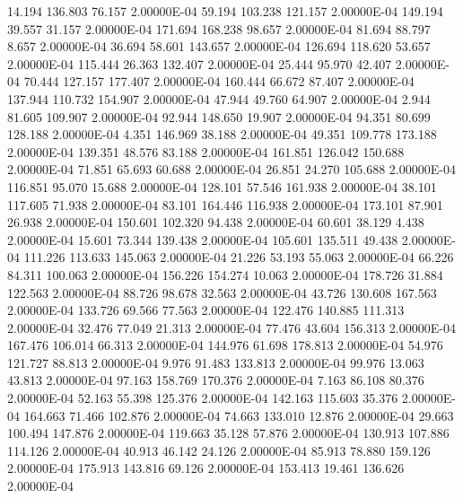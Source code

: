     14.194   136.803    76.157  2.00000E-04
    59.194   103.238   121.157  2.00000E-04
   149.194    39.557    31.157  2.00000E-04
   171.694   168.238    98.657  2.00000E-04
    81.694    88.797     8.657  2.00000E-04
    36.694    58.601   143.657  2.00000E-04
   126.694   118.620    53.657  2.00000E-04
   115.444    26.363   132.407  2.00000E-04
    25.444    95.970    42.407  2.00000E-04
    70.444   127.157   177.407  2.00000E-04
   160.444    66.672    87.407  2.00000E-04
   137.944   110.732   154.907  2.00000E-04
    47.944    49.760    64.907  2.00000E-04
     2.944    81.605   109.907  2.00000E-04
    92.944   148.650    19.907  2.00000E-04
    94.351    80.699   128.188  2.00000E-04
     4.351   146.969    38.188  2.00000E-04
    49.351   109.778   173.188  2.00000E-04
   139.351    48.576    83.188  2.00000E-04
   161.851   126.042   150.688  2.00000E-04
    71.851    65.693    60.688  2.00000E-04
    26.851    24.270   105.688  2.00000E-04
   116.851    95.070    15.688  2.00000E-04
   128.101    57.546   161.938  2.00000E-04
    38.101   117.605    71.938  2.00000E-04
    83.101   164.446   116.938  2.00000E-04
   173.101    87.901    26.938  2.00000E-04
   150.601   102.320    94.438  2.00000E-04
    60.601    38.129     4.438  2.00000E-04
    15.601    73.344   139.438  2.00000E-04
   105.601   135.511    49.438  2.00000E-04
   111.226   113.633   145.063  2.00000E-04
    21.226    53.193    55.063  2.00000E-04
    66.226    84.311   100.063  2.00000E-04
   156.226   154.274    10.063  2.00000E-04
   178.726    31.884   122.563  2.00000E-04
    88.726    98.678    32.563  2.00000E-04
    43.726   130.608   167.563  2.00000E-04
   133.726    69.566    77.563  2.00000E-04
   122.476   140.885   111.313  2.00000E-04
    32.476    77.049    21.313  2.00000E-04
    77.476    43.604   156.313  2.00000E-04
   167.476   106.014    66.313  2.00000E-04
   144.976    61.698   178.813  2.00000E-04
    54.976   121.727    88.813  2.00000E-04
     9.976    91.483   133.813  2.00000E-04
    99.976    13.063    43.813  2.00000E-04
    97.163   158.769   170.376  2.00000E-04
     7.163    86.108    80.376  2.00000E-04
    52.163    55.398   125.376  2.00000E-04
   142.163   115.603    35.376  2.00000E-04
   164.663    71.466   102.876  2.00000E-04
    74.663   133.010    12.876  2.00000E-04
    29.663   100.494   147.876  2.00000E-04
   119.663    35.128    57.876  2.00000E-04
   130.913   107.886   114.126  2.00000E-04
    40.913    46.142    24.126  2.00000E-04
    85.913    78.880   159.126  2.00000E-04
   175.913   143.816    69.126  2.00000E-04
   153.413    19.461   136.626  2.00000E-04
